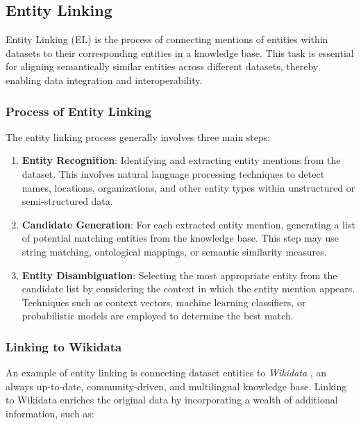 \subsection{Entity Linking}\label{VI-subsec:entitylinking}

Entity Linking (EL) is the process of connecting mentions of entities within datasets to their corresponding entities in a knowledge base. This task is essential for aligning semantically similar entities across different datasets, thereby enabling data integration and interoperability.

\subsubsection{Process of Entity Linking}

The entity linking process generally involves three main steps:

\begin{enumerate}
    \item \textbf{Entity Recognition}: Identifying and extracting entity mentions from the dataset. This involves natural language processing techniques to detect names, locations, organizations, and other entity types within unstructured or semi-structured data.
    \item \textbf{Candidate Generation}: For each extracted entity mention, generating a list of potential matching entities from the knowledge base. This step may use string matching, ontological mappings, or semantic similarity measures.
    \item \textbf{Entity Disambiguation}: Selecting the most appropriate entity from the candidate list by considering the context in which the entity mention appears. Techniques such as context vectors, machine learning classifiers, or probabilistic models are employed to determine the best match.
\end{enumerate}

\subsubsection{Linking to Wikidata}

An example of entity linking is connecting dataset entities to \textit{Wikidata} \cite{vrandecicWikidataFreeCollaborative2014}, an always up-to-date, community-driven, and multilingual knowledge base. Linking to Wikidata enriches the original data by incorporating a wealth of additional information, such as:

